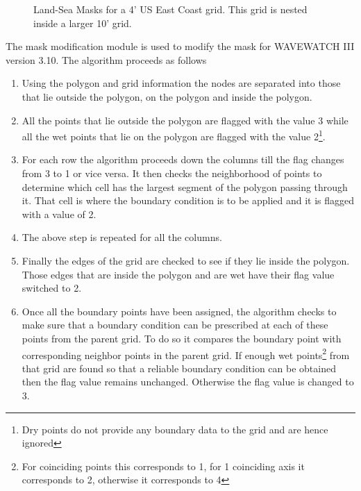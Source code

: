 \documentclass[12pt]{article}
\newcounter{myfigno}[section]
\newenvironment{myfig}[1]{\begin{figure}[#1]
                        \refstepcounter{myfigno}}
                       {\end{figure}}
\newcommand{\myfcap}[1]{\begin{list}{\ff Fig. \themyfigno\ :~\hfill}
                      {\rightmargin 8mm \labelsep 0mm
                       \labelwidth 8mm \leftmargin 8mm
                       \topsep 0mm \parskip 0mm \partopsep 0mm }
                       \item \ff #1 \end{list}}
\renewcommand{\themyfigno}{\thesection.\arabic{myfigno}}
\begin{document}
\setcounter{subfigure}{0}
\begin{myfig}{tbp}
\myfcap{Land-Sea Masks for a 4' US East Coast grid. This grid is nested inside a larger 10' grid.}
\label{fig:ec_lm}
\end{myfig}

The mask modification module is used to modify the mask for WAVEWATCH III version 3.10. The algorithm proceeds as follows
\renewcommand{\labelenumi}{Step~\theenumi:}
\begin{enumerate}
\item Using the polygon and grid information the nodes are separated into those that lie outside the polygon, on the polygon and inside the polygon.
\item All the points that lie outside the polygon are flagged with the value 3 while all the wet points that lie on the polygon are flagged with the value 2\footnote{Dry points do not provide any boundary data to the grid and are hence ignored}.
\item For each row the algorithm proceeds down the columns till the flag changes from 3 to 1 or vice versa. It then checks the neighborhood of points to determine which cell has the largest segment of the polygon passing through it. That cell is where the boundary condition is to be applied and it is flagged with a value of 2.
\item The above step is repeated for all the columns.
\item Finally the edges of the grid are checked to see if they lie inside the polygon. Those edges that are inside the polygon and are wet have their flag value switched to 2.
\item Once all the boundary points have been assigned, the algorithm checks to make sure that a boundary condition can be prescribed at each of these points from the parent grid. To do so it compares the boundary point with corresponding neighbor points in the parent grid. If enough wet points\footnote{For coinciding points this corresponds to 1, for 1 coinciding axis it corresponds to 2, otherwise it corresponds to 4} from that grid are found so that a reliable boundary condition can be obtained then the flag value remains unchanged. Otherwise the flag value is changed to 3.  
\end{enumerate}
\end{document}
